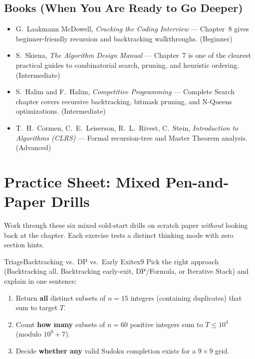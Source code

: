\documentclass[11pt,a4paper]{article}
\theoremstyle{definition}
\newcounter{exercise}
\begin{document}
\subsection*{Books (When You Are Ready to Go Deeper)}
\begin{itemize}
    \item G.\ Laakmann McDowell, \emph{Cracking the Coding Interview} --- Chapter~8 gives beginner-friendly recursion and backtracking walkthroughs. (Beginner)
    \item S.\ Skiena, \emph{The Algorithm Design Manual} --- Chapter~7 is one of the clearest practical guides to combinatorial search, pruning, and heuristic ordering. (Intermediate)
    \item S.\ Halim and F.\ Halim, \emph{Competitive Programming} --- Complete Search chapter covers recursive backtracking, bitmask pruning, and N-Queens optimizations. (Intermediate)
    \item T.\ H.\ Cormen, C.\ E.\ Leiserson, R.\ L.\ Rivest, C.\ Stein, \emph{Introduction to Algorithms (CLRS)} --- Formal recursion-tree and Master Theorem analysis. (Advanced)
\end{itemize}

\section*{Practice Sheet: Mixed Pen-and-Paper Drills}

\noindent
Work through these six mixed cold-start drills on scratch paper \emph{without} looking back at the chapter. Each exercise tests a distinct thinking mode with zero section hints.

\begin{tryitbox}{Triage}{Backtracking vs.\ DP vs.\ Early Exit}{ex9}
Pick the right approach (Backtracking all, Backtracking early-exit, DP/Formula, or Iterative Stack) and explain in one sentence:
\begin{enumerate}
    \item Return \textbf{all} distinct subsets of $n = 15$ integers (containing duplicates) that sum to target $T$.
    \item Count \textbf{how many} subsets of $n = 60$ positive integers sum to $T \le 10^4$ (modulo $10^9 + 7$).
    \item Decide \textbf{whether any} valid Sudoku completion exists for a $9 \times 9$ grid.
\end{enumerate}
\end{tryitbox}
\end{document}
